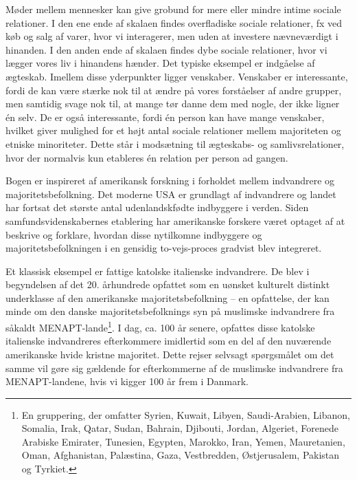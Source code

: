 \documentclass[
]{book}
\begin{document}
Møder mellem mennesker kan give grobund for mere eller mindre intime sociale relationer. I den ene ende af skalaen findes overfladiske sociale relationer, fx ved køb og salg af varer, hvor vi interagerer, men uden at investere nævneværdigt i hinanden. I den anden ende af skalaen findes dybe sociale relationer, hvor vi lægger vores liv i hinandens hænder. Det typiske eksempel er indgåelse af ægteskab. Imellem disse yderpunkter ligger venskaber. Venskaber er interessante, fordi de kan være stærke nok til at ændre på vores forståelser af andre grupper, men samtidig svage nok til, at mange tør danne dem med nogle, der ikke ligner én selv. De er også interessante, fordi én person kan have mange venskaber, hvilket giver mulighed for et højt antal sociale relationer mellem majoriteten og etniske minoriteter. Dette står i modsætning til ægteskabs- og samlivsrelationer, hvor der normalvis kun etableres én relation per person ad gangen.

Bogen er inspireret af amerikansk forskning i forholdet mellem indvandrere og majoritetsbefolkning. Det moderne USA er grundlagt af indvandrere og landet har fortsat det største antal udenlandskfødte indbyggere i verden. Siden samfundsvidenskabernes etablering har amerikanske forskere været optaget af at beskrive og forklare, hvordan disse nytilkomne indbyggere og majoritetsbefolkningen i en gensidig to-vejs-proces gradvist blev integreret.

Et klassisk eksempel er fattige katolske italienske indvandrere. De blev i begyndelsen af det 20. århundrede opfattet som en uønsket kulturelt distinkt underklasse af den amerikanske majoritetsbefolkning -- en opfattelse, der kan minde om den danske majoritetsbefolknings syn på muslimske indvandrere fra såkaldt MENAPT-lande\footnote{En gruppering, der omfatter Syrien, Kuwait, Libyen, Saudi-Arabien, Libanon, Somalia, Irak, Qatar, Sudan, Bahrain, Djibouti, Jordan, Algeriet, Forenede Arabiske Emirater, Tunesien, Egypten, Marokko, Iran, Yemen, Mauretanien, Oman, Afghanistan, Palæstina, Gaza, Vestbredden, Østjerusalem, Pakistan og Tyrkiet.}. I dag, ca. 100 år senere, opfattes disse katolske italienske indvandreres efterkommere imidlertid som en del af den nuværende amerikanske hvide kristne majoritet. Dette rejser selvsagt spørgsmålet om det samme vil gøre sig gældende for efterkommerne af de muslimske indvandrere fra MENAPT-landene, hvis vi kigger 100 år frem i Danmark.
\end{document}
